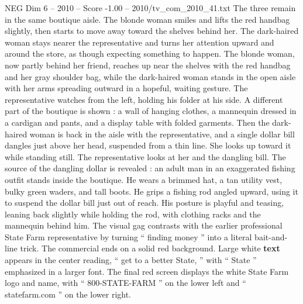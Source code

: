 \begin{textsample}{NEG Dim 6 – 2010 – Score -1.00 – 2010/tv\_com\_2010\_41.txt}
The three remain in the same boutique aisle.
The blonde woman smiles and lifts the red handbag slightly, then starts to move away toward the shelves behind her.
The dark-haired woman stays nearer the representative and turns her attention upward and around the store, as though expecting something to happen.
The blonde woman, now partly behind her friend, reaches up near the shelves with the red handbag and her gray shoulder bag, while the dark-haired woman stands in the open aisle with her arms spreading outward in a hopeful, waiting gesture.
The representative watches from the left, holding his folder at his side.
A different part of the boutique is shown : a wall of hanging clothes, a mannequin dressed in a cardigan and pants, and a display table with folded garments.
Then the dark-haired woman is back in the aisle with the representative, and a single dollar bill dangles just above her head, suspended from a thin line.
She looks up toward it while standing still.
The representative looks at her and the dangling bill.
The source of the dangling dollar is revealed : an adult man in an exaggerated fishing outfit stands inside the boutique.
He wears a brimmed hat, a tan utility vest, bulky green waders, and tall boots.
He grips a fishing rod angled upward, using it to suspend the dollar bill just out of reach.
His posture is playful and teasing, leaning back slightly while holding the rod, with clothing racks and the mannequin behind him.
The visual gag contrasts with the earlier professional State Farm representative by turning “ finding money ” into a literal bait-and-line trick.
The commercial ends on a solid red background.
Large white \textbf{text} appears in the center reading, “ get to a better State, ” with “ State ” emphasized in a larger font.
The final red screen displays the white State Farm logo and name, with “ 800-STATE-FARM ” on the lower left and “ statefarm.com ” on the lower right.

\end{textsample}
